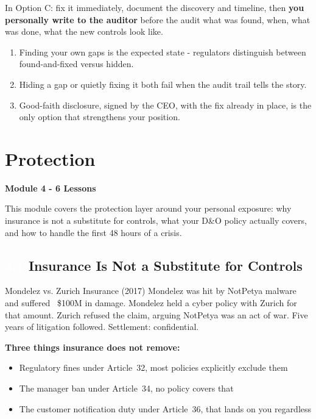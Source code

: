 \documentclass[11pt,a4paper,twoside]{book}
\newcommand{\lessontag}[1]{%
  \texorpdfstring{%
    \setlength{\fboxsep}{3pt}\colorbox{nisd2blue}{\textcolor{white}{\footnotesize\bfseries #1}}\quad%
  }{Lesson #1\ }%
}
\begin{document}
In Option C: fix it immediately, document the discovery and timeline, then \textbf{you personally write to the auditor} before the audit  what was found, when, what was done, what the new controls look like.

\begin{keytakeaways}
\begin{enumerate}
  \item Finding your own gaps is the expected state - regulators distinguish between found-and-fixed versus hidden.
  \item Hiding a gap or quietly fixing it both fail when the audit trail tells the story.
  \item Good-faith disclosure, signed by the CEO, with the fix already in place, is the only option that strengthens your position.
\end{enumerate}
\end{keytakeaways}


\chapter{Protection}

\begin{moduleintro}
\textbf{Module 4 - 6 Lessons}

This module covers the protection layer around your personal exposure: why insurance is not a substitute for controls, what your D\&O policy actually covers, and how to handle the first 48 hours of a crisis.
\end{moduleintro}

\section{\lessontag{4.1}Insurance Is Not a Substitute for Controls}

\begin{casestudy}{Mondelez vs. Zurich Insurance (2017)}
Mondelez was hit by NotPetya malware and suffered ~\$100M in damage. Mondelez held a cyber policy with Zurich for that amount. Zurich refused the claim, arguing NotPetya was an act of war. Five years of litigation followed. Settlement: confidential.
\end{casestudy}

\textbf{Three things insurance does not remove:}
\begin{itemize}
  \item Regulatory fines under Article~32, most policies explicitly exclude them
  \item The manager ban under Article~34, no policy covers that
  \item The customer notification duty under Article~36, that lands on you regardless
\end{itemize}
\end{document}
